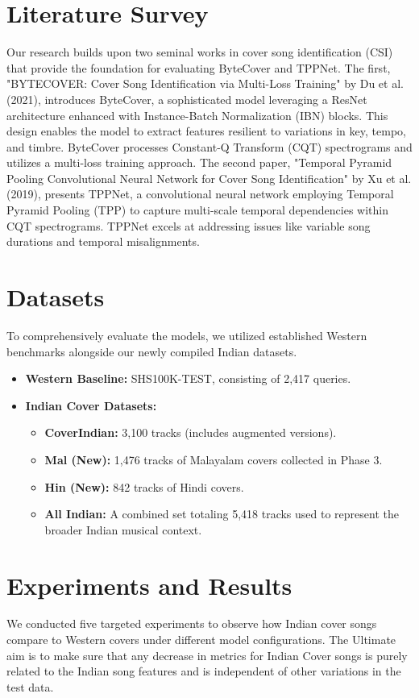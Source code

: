 \documentclass[conference]{IEEEtran}
\begin{document}
\section{Literature Survey}
Our research builds upon two seminal works in cover song identification (CSI) that provide the foundation for evaluating ByteCover and TPPNet. The first, "BYTECOVER: Cover Song Identification via Multi-Loss Training" by Du et al. (2021), introduces ByteCover, a sophisticated model leveraging a ResNet architecture enhanced with Instance-Batch Normalization (IBN) blocks. This design enables the model to extract features resilient to variations in key, tempo, and timbre. ByteCover processes Constant-Q Transform (CQT) spectrograms and utilizes a multi-loss training approach.
The second paper, "Temporal Pyramid Pooling Convolutional Neural Network for Cover Song Identification" by Xu et al. (2019), presents TPPNet, a convolutional neural network employing Temporal Pyramid Pooling (TPP) to capture multi-scale temporal dependencies within CQT spectrograms. TPPNet excels at addressing issues like variable song durations and temporal misalignments.

\section{Datasets}
To comprehensively evaluate the models, we utilized established Western benchmarks alongside our newly compiled Indian datasets.
\begin{itemize}
    \item \textbf{Western Baseline:} SHS100K-TEST, consisting of 2,417 queries.
    \item \textbf{Indian Cover Datasets:}
    \begin{itemize}
        \item \textbf{CoverIndian:} 3,100 tracks (includes augmented versions).
        \item \textbf{Mal (New):} 1,476 tracks of Malayalam covers collected in Phase 3.
        \item \textbf{Hin (New):} 842 tracks of Hindi covers.
        \item \textbf{All Indian:} A combined set totaling 5,418 tracks used to represent the broader Indian musical context.
    \end{itemize}
\end{itemize}



\section{Experiments and Results}
We conducted five targeted experiments to observe how Indian cover songs compare to Western covers under different model configurations. The Ultimate aim is to make sure that any decrease in metrics for Indian Cover songs is purely related to the Indian song features and is independent of other variations in the test data.
\end{document}
